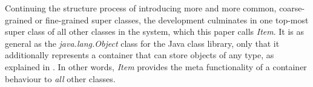 Continuing the structure process of introducing more and more common, coarse-grained
or fine-grained super classes, the development culminates in one top-most super
class of all other classes in the system, which this paper calls \emph{Item}.
It is as general as the \emph{java.lang.Object} class for the Java class library,
only that it additionally represents a container that can store objects of any type,
as explained in \cite{hellerbohl}. In other words, \emph{Item} provides the meta
functionality of a container behaviour to \emph{all} other classes.

